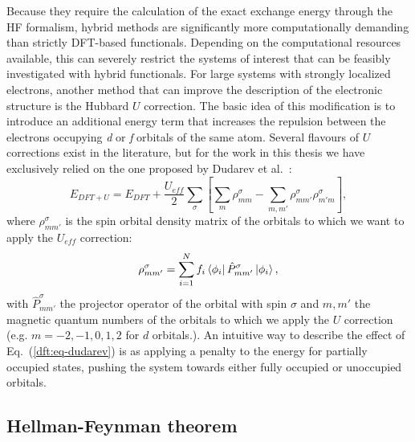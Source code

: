 \begin{refsection}
Because they require the calculation of the exact exchange energy through the 
HF formalism, hybrid methods are significantly more computationally demanding 
than strictly DFT-based functionals. Depending on the computational resources 
available, this can severely restrict the systems of interest that can be 
feasibly investigated with hybrid functionals. For large systems with strongly 
localized electrons, another method that can improve the description of the 
electronic structure is the Hubbard $U$ correction. The basic idea of this 
modification is to introduce an additional energy term that increases the 
repulsion between the electrons occupying \textit{d} or \textit{f} orbitals of 
the same atom. Several flavours of $U$ corrections exist in the literature, 
but for the work in this thesis we have exclusively relied on the one proposed 
by Dudarev et al.~\cite{Dudarev1998}: 
\begin{equation}\label{dft:eq-dudarev} 
E_{DFT+U} = E_{DFT} + \frac{U_{eff}}{2} \sum_\sigma \left[ \sum_m 
\rho_{mm}^\sigma - \sum_{m, m'} \rho_{mm'}^\sigma\rho_{m'm}^\sigma\right], 
\end{equation} 
where $\rho^\sigma_{mm'}$ is the spin orbital density matrix of the orbitals to which we 
want to apply the $U_{eff}$ correction:
\begin{equation}
\rho^\sigma_{mm'} = \sum_{i=1}^N f_i \bra{\phi_i} \hat{P}_{mm'}^\sigma \ket{\phi_i},
\end{equation}
with $\hat{P}_{mm'}^\sigma$ the projector operator of the orbital with spin 
$\sigma$ and $m, m'$ the magnetic quantum numbers of the orbitals 
to which we apply the $U$ correction (e.g. $m=-2, -1, 0, 1, 2$ for $d$ 
orbitals.). An intuitive way to describe the effect of 
Eq.~(\ref{dft:eq-dudarev}) is as applying a penalty to the energy for partially 
occupied states, pushing the system towards either fully occupied or 
unoccupied orbitals. 

\subsection{Hellman-Feynman theorem} \label{dft:sec-hellmann} 
 

\end{refsection}
